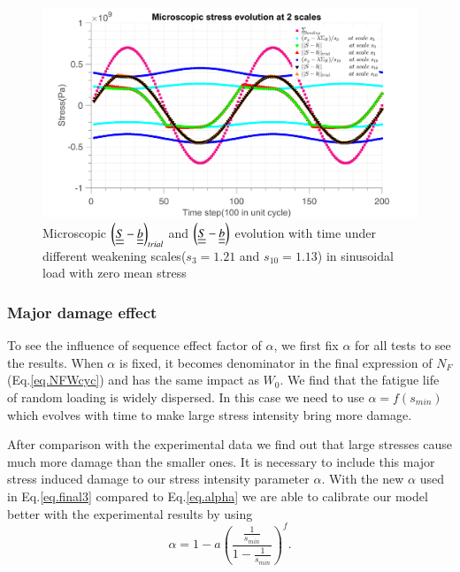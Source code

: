 \documentclass[3p,times,procedia,number]{elsarticle}
\begin{document}
\begin{figure}[!h]
	\centering
	\includegraphics[width=\textwidth]{figures//trialsin_0.png} 
	\caption{Microscopic $\left(  \uline{\uline{S}}-\uline{\uline{b}}\right)_{trial}$ and $\left( \uline{\uline{S}}-\uline{\uline{b}}\right)$ evolution with time under different weakening scales($s_{3}=1.21$ and $s_{10}=1.13$) in sinusoidal load with zero mean stress}
	\label{fig.trialsin0}
\end{figure}


\clearpage
\subsubsection{Major damage effect}

To see the influence of sequence effect factor of $\alpha$, we first fix $\alpha$ for all tests to see the results. When $\alpha$ is fixed, it becomes denominator in the final expression of $N_F$ (Eq.\eqref{eq.NFWcyc}) and has the same impact as $W_0$. We find  that the fatigue life of random loading is widely dispersed. In this case we need to use $\alpha=f(s_{min})$ which evolves with time to make large stress intensity bring more damage.

After comparison with the experimental data we find out that large stresses cause much more damage than the smaller ones. It is necessary to include this major stress induced damage to our stress intensity parameter $\alpha$. With the new $\alpha$ used in Eq.\eqref{eq.final3} compared to Eq.\eqref{eq.alpha} we are able to calibrate our model better with the experimental results by using 
\begin{equation}
\alpha=1-a\left(  \dfrac{\frac{1}{s_{min}}}{1-\frac{1}{s_{min}}} \right) ^{f}.
\label{eq.majoralp}
\end{equation}
\end{document}
